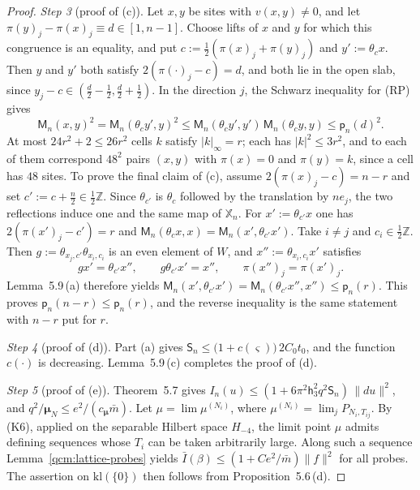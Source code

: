\documentclass[11pt,letterpaper,reqno]{amsart}
\theoremstyle{definition}
\begin{document}
\begin{proof}
\emph{Step 3} (proof of (c)).
Let $x,y$ be sites with $v(x,y)\ne0$, and let $\pi(y)_j-\pi(x)_j\equiv d\in[1,n-1]$.
Choose lifts of $x$ and $y$ for which this congruence is an equality, and put $c:=\frac12(\pi(x)_j+\pi(y)_j)$ and $y':=\theta_cx$.
Then $y$ and $y'$ both satisfy $2(\pi(\cdot)_j-c)=d$, and both lie in the open slab, since $y_j-c\in(\frac d2-\frac12,\frac d2+\frac12)$.
In the direction $j$, the Schwarz inequality for (RP) gives
\begin{equation*}
\mathsf M_n(x,y)^2=\mathsf M_n(\theta_cy',y)^2\le\mathsf M_n(\theta_cy',y')\,\mathsf M_n(\theta_cy,y)\le\mathsf p_n(d)^2.
\end{equation*}
At most $24r^2+2\le26r^2$ cells $k$ satisfy $|k|_\infty=r$; each has $|k|^2\le3r^2$, and to each of them correspond $48^2$ pairs $(x,y)$ with $\pi(x)=0$ and $\pi(y)=k$, since a cell has $48$ sites.
To prove the final claim of (c), assume $2(\pi(x)_j-c)=n-r$ and set $c':=c+\frac n2\in\frac12\mathbb Z$.
Since $\theta_{c'}$ is $\theta_c$ followed by the translation by $ne_j$, the two reflections induce one and the same map of $\mathbb X_n$.
For $x':=\theta_{c'}x$ one has $2(\pi(x')_j-c')=r$ and $\mathsf M_n(\theta_cx,x)=\mathsf M_n(x',\theta_{c'}x')$.
Take $i\ne j$ and $c_i\in\frac12\mathbb Z$.
Then $g:=\theta_{x_j,c'}\theta_{x_i,c_i}$ is an even element of $W$, and $x'':=\theta_{x_i,c_i}x'$ satisfies
\begin{equation*}
gx'=\theta_{c'}x'',\qquad g\theta_{c'}x'=x'',\qquad\pi(x'')_j=\pi(x')_j.
\end{equation*}
Lemma~5.9\,(a) therefore yields $\mathsf M_n(x',\allowbreak \theta_{c'}x')=\allowbreak \mathsf M_n(\theta_{c'}x'',\allowbreak x'')\le\mathsf p_n(r)$.
This proves $\mathsf p_n(n-r)\le\mathsf p_n(r)$, and the reverse inequality is the same statement with $n-r$ put for $r$.

\emph{Step 4} (proof of (d)).
Part (a) gives $\mathsf S_n\le\bigl(1+c(\varsigma)\bigr)\,2C_0t_0$, and the function $c(\cdot)$ is decreasing.
Lemma~5.9\,(c) completes the proof of (d).

\emph{Step 5} (proof of (e)).
Theorem~5.7 gives $I_n(u)\le(1+6\pi^2\mathsf h_3^2q^2\mathsf S_n)\,\|du\|^2$, and $q^2/\boldsymbol\mu_N\le e^2/(c_{\boldsymbol\mu}\bar m)$.
Let $\mu=\lim\mu^{(N_i)}$, where $\mu^{(N_i)}=\lim_jP_{N_i,T_{ij}}$.
By (K6), applied on the separable Hilbert space $H_{-4}$, the limit point $\mu$ admits defining sequences whose $T_i$ can be taken arbitrarily large.
Along such a sequence Lemma~\ref{qcm:lattice-probes} yields $\bar I(\beta)\le(1+Ce^2/\bar m)\|f\|^2$ for all probes.
The assertion on $\mathrm{kl}(\{0\})$ then follows from Proposition~5.6\,(d).
\end{proof}
\end{document}
